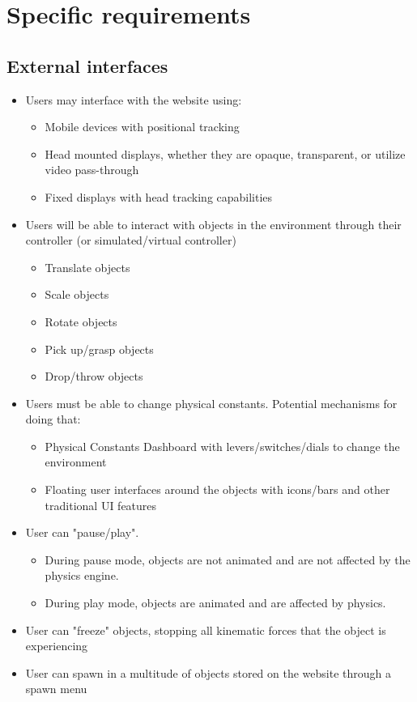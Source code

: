 \section{Specific requirements}
\subsection{External interfaces}
\begin{itemize}
    \item Users may interface with the website using:
    \begin{itemize}
    \item Mobile devices with positional tracking
        \item Head mounted displays, whether they are opaque, transparent, or utilize video pass-through
        \item Fixed displays with head tracking capabilities
    \end{itemize}
    \item Users will be able to interact with objects in the environment through their controller (or simulated/virtual controller)
    \begin{itemize}
        \item Translate objects
        \item Scale objects
        \item Rotate objects
        \item Pick up/grasp objects
        \item Drop/throw objects
    \end{itemize}
    \item Users must be able to change physical constants.  Potential mechanisms for doing that:
    \begin{itemize}
        \item Physical Constants Dashboard with levers/switches/dials to change the environment
        \item Floating user interfaces around the objects with icons/bars and other traditional UI features
    \end{itemize}
    \item User can "pause/play". 
    \begin{itemize}
        \item During pause mode, objects are not animated and are not affected by the physics engine.
        \item During play mode, objects are animated and are affected by physics.
    \end{itemize}
    \item User can "freeze" objects, stopping all kinematic forces that the object is experiencing
    \item User can spawn in a multitude of objects stored on the website through a spawn menu
        
\end{itemize}

